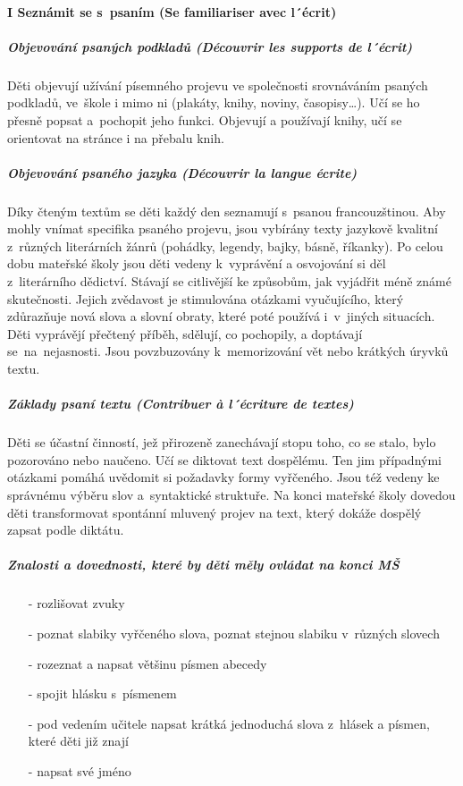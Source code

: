 			\paragraph*{I Seznámit se s psaním (Se familiariser avec l´écrit)}
				\subparagraph{Objevování psaných podkladů (Découvrir les supports de l´écrit)}
					Děti objevují užívání písemného projevu ve společnosti srovnáváním psaných podkladů, ve škole i mimo ni (plakáty, knihy, noviny, časopisy…). Učí se ho přesně popsat a pochopit jeho funkci. Objevují a používají knihy, učí se orientovat na stránce i na přebalu knih. 
				\subparagraph{Objevování psaného jazyka (Découvrir la langue écrite)}
					Díky čteným textům se děti každý den seznamují s psanou francouzštinou. Aby mohly vnímat specifika psaného projevu, jsou vybírány texty jazykově kvalitní z různých literárních žánrů (pohádky, legendy, bajky, básně, říkanky). Po celou dobu mateřské školy jsou děti vedeny k vyprávění a osvojování si děl z literárního dědictví. Stávají se citlivější ke způsobům, jak vyjádřit méně známé skutečnosti. Jejich zvědavost je stimulována otázkami vyučujícího, který zdůrazňuje nová slova a slovní obraty, které poté používá i v jiných situacích.  Děti vyprávějí přečtený příběh, sdělují, co pochopily, a doptávají se na nejasnosti. Jsou povzbuzovány k memorizování vět nebo krátkých úryvků textu. 
				\subparagraph{Základy psaní textu (Contribuer à l´écriture de textes)}
					Děti se účastní činností, jež přirozeně zanechávají stopu toho, co se stalo, bylo pozorováno nebo naučeno. Učí se diktovat text dospělému. Ten jim případnými otázkami pomáhá uvědomit si požadavky formy vyřčeného. Jsou též vedeny ke správnému výběru slov a syntaktické struktuře. Na konci mateřské školy dovedou děti transformovat spontánní mluvený projev na text, který dokáže dospělý zapsat podle diktátu.

				\subparagraph{Znalosti a dovednosti, které by děti měly ovládat na konci MŠ \hspace{3cm}}

				\begin{itemize}
					\setlength\itemsep{-2mm}
					\item[-] rozlišovat zvuky
					\item[-] poznat slabiky vyřčeného slova, poznat stejnou slabiku v různých slovech
					\item[-] rozeznat a napsat většinu písmen abecedy
					\item[-] spojit hlásku s písmenem
					\item[-] pod vedením učitele napsat krátká jednoduchá slova z hlásek a písmen, které děti již znají 	
					\item[-] napsat své jméno
				\end{itemize}


